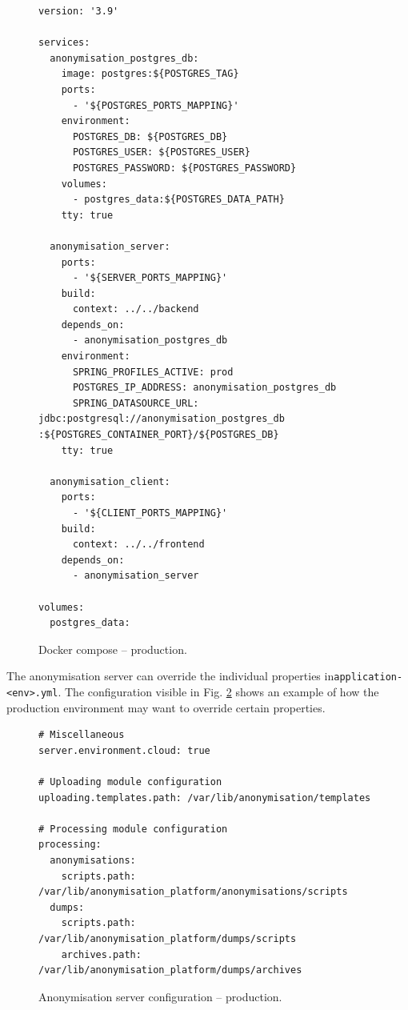 \documentclass[a4paper,twoside,12pt]{book}
\begin{document}
\begin{figure}[h]
\begin{verbatim}
version: '3.9'

services:
  anonymisation_postgres_db:
    image: postgres:${POSTGRES_TAG}
    ports:
      - '${POSTGRES_PORTS_MAPPING}'
    environment:
      POSTGRES_DB: ${POSTGRES_DB}
      POSTGRES_USER: ${POSTGRES_USER}
      POSTGRES_PASSWORD: ${POSTGRES_PASSWORD}
    volumes:
      - postgres_data:${POSTGRES_DATA_PATH}
    tty: true

  anonymisation_server:
    ports:
      - '${SERVER_PORTS_MAPPING}'
    build:
      context: ../../backend
    depends_on:
      - anonymisation_postgres_db
    environment:
      SPRING_PROFILES_ACTIVE: prod
      POSTGRES_IP_ADDRESS: anonymisation_postgres_db
      SPRING_DATASOURCE_URL: jdbc:postgresql://anonymisation_postgres_db :${POSTGRES_CONTAINER_PORT}/${POSTGRES_DB}
    tty: true

  anonymisation_client:
    ports:
      - '${CLIENT_PORTS_MAPPING}'
    build:
      context: ../../frontend
    depends_on:
      - anonymisation_server

volumes:
  postgres_data:
\end{verbatim}
\caption{Docker compose – production.}
\label{fig:code:docker_compose_production}
\end{figure}

The anonymisation server can override the individual properties in\newline \verb|application-<env>.yml|. The configuration visible in Fig. \ref{fig:code:application_prod_yml} shows an example of how the production environment may want to override certain properties.

\begin{figure}[H]
\begin{verbatim}
# Miscellaneous
server.environment.cloud: true

# Uploading module configuration
uploading.templates.path: /var/lib/anonymisation/templates

# Processing module configuration
processing:
  anonymisations:
    scripts.path: /var/lib/anonymisation_platform/anonymisations/scripts
  dumps:
    scripts.path: /var/lib/anonymisation_platform/dumps/scripts
    archives.path: /var/lib/anonymisation_platform/dumps/archives
\end{verbatim}
\caption{Anonymisation server configuration -- production.}
\label{fig:code:application_prod_yml}
\end{figure}
\end{document}
